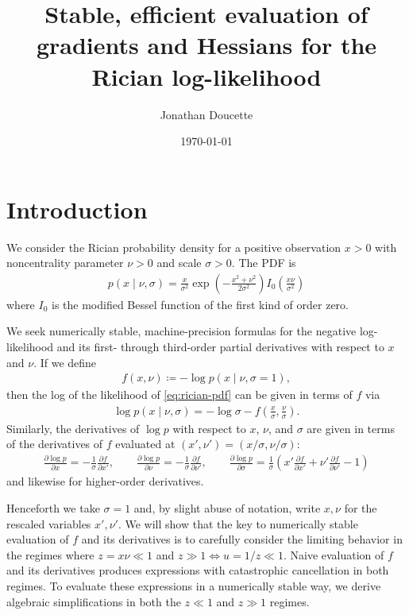 \documentclass{article}
\title{Stable, efficient evaluation of gradients and Hessians for the Rician log-likelihood}
\author{Jonathan Doucette}
\date{\today}
\begin{document}
\maketitle

\section{Introduction}

We consider the Rician probability density for a positive observation $x>0$ with noncentrality parameter $\nu>0$ and scale $\sigma>0$.
The PDF is
%
\begin{align}
  p(x \mid \nu, \sigma) = \frac{x}{\sigma^2} \exp\left(-\frac{x^2+\nu^2}{2\sigma^2}\right) I_0\left(\frac{x\nu}{\sigma^2}\right) \label{eq:rician-pdf}
\end{align}
%
where $I_0$ is the modified Bessel function of the first kind of order zero.

We seek numerically stable, machine-precision formulas for the negative log-likelihood and its first- through third-order partial derivatives with respect to $x$ and $\nu$.
If we define
%
\begin{align}
  f(x, \nu) \coloneqq -\log p(x \mid \nu, \sigma = 1),
\end{align}
%
then the log of the likelihood of \cref{eq:rician-pdf} can be given in terms of $f$ via
%
\begin{align}
  \log p(x \mid \nu, \sigma) = -\log\sigma - f\left(\frac{x}{\sigma}, \frac{\nu}{\sigma}\right).
\end{align}
%
Similarly, the derivatives of $\log p$ with respect to $x$, $\nu$, and $\sigma$ are given in terms of the derivatives of $f$ evaluated at $(x', \nu') = (x / \sigma, \nu / \sigma)$:
%
\begin{align}
  \frac{\partial \log p}{\partial x}      = -\frac{1}{\sigma} \frac{\partial f}{\partial x'},                                                                                        \qquad
  \frac{\partial \log p}{\partial \nu}    = -\frac{1}{\sigma} \frac{\partial f}{\partial \nu'},                                                                                      \qquad
  \frac{\partial \log p}{\partial \sigma} = \frac{1}{\sigma} \left( x' \frac{\partial f}{\partial x'} + \nu' \frac{\partial f}{\partial \nu'} - 1 \right)
\end{align}
%
and likewise for higher-order derivatives.

Henceforth we take $\sigma=1$ and, by slight abuse of notation, write $x, \nu$ for the rescaled variables $x', \nu'$.
We will show that the key to numerically stable evaluation of $f$ and its derivatives is to carefully consider the limiting behavior in the regimes where $z = x\nu \ll 1$ and $z \gg 1 \Leftrightarrow u=1/z \ll 1$.
Naive evaluation of $f$ and its derivatives produces expressions with catastrophic cancellation in both regimes.
To evaluate these expressions in a numerically stable way, we derive algebraic simplifications in both the $z \ll 1$ and $z \gg 1$ regimes.
\end{document}
